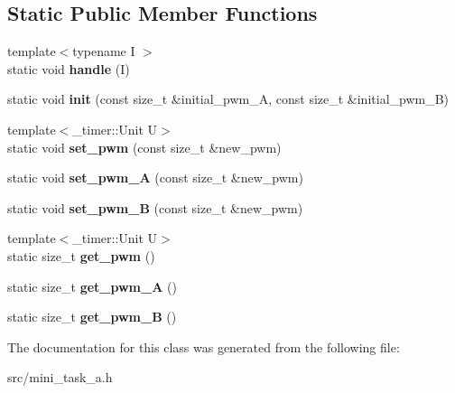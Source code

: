 \subsection*{Static Public Member Functions}
\begin{DoxyCompactItemize}
\item 
\hypertarget{classPwm_a4b0e7aee2bc275397e72f5a548e479f1}{}\label{classPwm_a4b0e7aee2bc275397e72f5a548e479f1} 
{\footnotesize template$<$typename I $>$ }\\static void {\bfseries handle} (I)
\item 
\hypertarget{classPwm_ab13355852b2542a347272c2e7ba59c93}{}\label{classPwm_ab13355852b2542a347272c2e7ba59c93} 
static void {\bfseries init} (const size\+\_\+t \&initial\+\_\+pwm\+\_\+A, const size\+\_\+t \&initial\+\_\+pwm\+\_\+B)
\item 
\hypertarget{classPwm_a83d86e1254dcc081e0ed0d979c0dab7c}{}\label{classPwm_a83d86e1254dcc081e0ed0d979c0dab7c} 
{\footnotesize template$<$\+\_\+timer\+::\+Unit U$>$ }\\static void {\bfseries set\+\_\+pwm} (const size\+\_\+t \&new\+\_\+pwm)
\item 
\hypertarget{classPwm_a050bd4fb360d94f5538fc22b187149c3}{}\label{classPwm_a050bd4fb360d94f5538fc22b187149c3} 
static void {\bfseries set\+\_\+pwm\+\_\+A} (const size\+\_\+t \&new\+\_\+pwm)
\item 
\hypertarget{classPwm_a077fde815602fffbcf57a7959ee6e5cc}{}\label{classPwm_a077fde815602fffbcf57a7959ee6e5cc} 
static void {\bfseries set\+\_\+pwm\+\_\+B} (const size\+\_\+t \&new\+\_\+pwm)
\item 
\hypertarget{classPwm_a3b5d5335c48c1a4027890ae4ea4d25fe}{}\label{classPwm_a3b5d5335c48c1a4027890ae4ea4d25fe} 
{\footnotesize template$<$\+\_\+timer\+::\+Unit U$>$ }\\static size\+\_\+t {\bfseries get\+\_\+pwm} ()
\item 
\hypertarget{classPwm_a565023d9bf553023363329a29b8a03a9}{}\label{classPwm_a565023d9bf553023363329a29b8a03a9} 
static size\+\_\+t {\bfseries get\+\_\+pwm\+\_\+A} ()
\item 
\hypertarget{classPwm_a2dbc254931f58ae344b44c9b3c6e9406}{}\label{classPwm_a2dbc254931f58ae344b44c9b3c6e9406} 
static size\+\_\+t {\bfseries get\+\_\+pwm\+\_\+B} ()
\end{DoxyCompactItemize}


The documentation for this class was generated from the following file\+:\begin{DoxyCompactItemize}
\item 
src/mini\+\_\+task\+\_\+a.\+h\end{DoxyCompactItemize}
